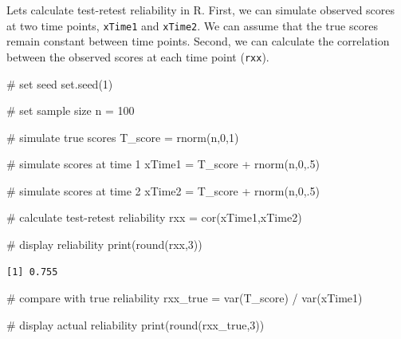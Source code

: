 \documentclass[
  letterpaper,
  DIV=11,
  numbers=noendperiod]{scrreprt}
\newenvironment{Shaded}{\begin{snugshade}}{\end{snugshade}}
\newcommand{\CommentTok}[1]{\textcolor[rgb]{0.37,0.37,0.37}{#1}}
\newcommand{\DecValTok}[1]{\textcolor[rgb]{0.68,0.00,0.00}{#1}}
\newcommand{\FunctionTok}[1]{\textcolor[rgb]{0.28,0.35,0.67}{#1}}
\newcommand{\NormalTok}[1]{\textcolor[rgb]{0.00,0.23,0.31}{#1}}
\newcommand{\OtherTok}[1]{\textcolor[rgb]{0.00,0.23,0.31}{#1}}
\newcommand{\SpecialCharTok}[1]{\textcolor[rgb]{0.37,0.37,0.37}{#1}}
\begin{document}
Lets calculate test-retest reliability in R. First, we can simulate
observed scores at two time points, \texttt{xTime1} and \texttt{xTime2}.
We can assume that the true scores remain constant between time points.
Second, we can calculate the correlation between the observed scores at
each time point (\texttt{rxx}).

\begin{Shaded}
\begin{Highlighting}[]
\CommentTok{\# set seed}
\FunctionTok{set.seed}\NormalTok{(}\DecValTok{1}\NormalTok{)}

\CommentTok{\# set sample size}
\NormalTok{n }\OtherTok{=} \DecValTok{100}

\CommentTok{\# simulate true scores}
\NormalTok{T\_score }\OtherTok{=} \FunctionTok{rnorm}\NormalTok{(n,}\DecValTok{0}\NormalTok{,}\DecValTok{1}\NormalTok{)}

\CommentTok{\# simulate scores at time 1}
\NormalTok{xTime1 }\OtherTok{=}\NormalTok{ T\_score }\SpecialCharTok{+} \FunctionTok{rnorm}\NormalTok{(n,}\DecValTok{0}\NormalTok{,.}\DecValTok{5}\NormalTok{)}

\CommentTok{\# simulate scores at time 2}
\NormalTok{xTime2 }\OtherTok{=}\NormalTok{ T\_score }\SpecialCharTok{+} \FunctionTok{rnorm}\NormalTok{(n,}\DecValTok{0}\NormalTok{,.}\DecValTok{5}\NormalTok{)}

\CommentTok{\# calculate test{-}retest reliability}
\NormalTok{rxx }\OtherTok{=} \FunctionTok{cor}\NormalTok{(xTime1,xTime2)}

\CommentTok{\# display reliability}
\FunctionTok{print}\NormalTok{(}\FunctionTok{round}\NormalTok{(rxx,}\DecValTok{3}\NormalTok{))}
\end{Highlighting}
\end{Shaded}

\begin{verbatim}
[1] 0.755
\end{verbatim}

\begin{Shaded}
\begin{Highlighting}[]
\CommentTok{\# compare with true reliability}
\NormalTok{rxx\_true }\OtherTok{=} \FunctionTok{var}\NormalTok{(T\_score) }\SpecialCharTok{/} \FunctionTok{var}\NormalTok{(xTime1)}

\CommentTok{\# display actual reliability}
\FunctionTok{print}\NormalTok{(}\FunctionTok{round}\NormalTok{(rxx\_true,}\DecValTok{3}\NormalTok{))}
\end{Highlighting}
\end{Shaded}
\end{document}
